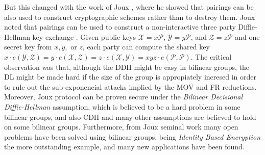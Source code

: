But this changed with the work of Joux \cite{ANTS:Joux00}, where he showed that pairings can be also used to construct cryptographic schemes rather than to destroy them. Joux noted that pairings can be used to construct a non-interactive three party Diffie-Hellman key exchange \cite{ANTS:Joux00}. Given public keys $\mathcal{X}=x\mathcal{P}$, $\mathcal{Y}=y\mathcal{P}$, and $\mathcal{Z}=z\mathcal{P}$ and one secret key from $x,y,$ or $z$, each party can compute the shared key $x\cdot e(\mathcal{Y},\mathcal{Z})= y\cdot e(\mathcal{X},\mathcal{Z})= z\cdot e(\mathcal{X},\mathcal{Y})=xyz\cdot e(\mathcal{P},\mathcal{P})$. The critical observation was that, although the DDH might be easy in bilinear groups, the DL might be made hard if the size of the group is appropiately incresed in order to rule out the sub-exponencial attacks implied by the MOV and FR reductions. Moreover, Joux protocol can be proven secure under the \emph{Bilinear Decisional Diffie-Hellman} assumption, which is believed to be a hard problem in some bilinear groups, and also CDH and many other assumptions are believed to hold on some bilinear groups. Furthermore, from Joux seminal work many open problems have been solved using bilinear groups, being \emph{Identity Based Encryption} \cite{C:BonFra01} the more outstanding example, and many new applications have been found. 

%
%

